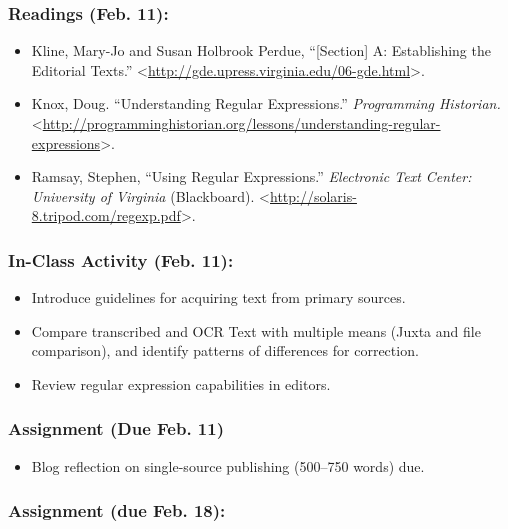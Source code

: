 \documentclass[]{article}
\begin{document}
\subsubsection{Readings (Feb. 11):}\label{readings-feb.-11}

\begin{itemize}
\itemsep1pt\parskip0pt
\item
  Kline, Mary-Jo and Susan Holbrook Perdue, ``{[}Section{]} A:
  Establishing the Editorial Texts.''
  \textless{}\url{http://gde.upress.virginia.edu/06-gde.html}\textgreater{}.
\item
  Knox, Doug. ``Understanding Regular Expressions.'' \emph{Programming
  Historian.}
  \textless{}\url{http://programminghistorian.org/lessons/understanding-regular-expressions}\textgreater{}.
\item
  Ramsay, Stephen, ``Using Regular Expressions.'' \emph{Electronic Text
  Center: University of Virginia} (Blackboard).
  \textless{}\url{http://solaris-8.tripod.com/regexp.pdf}\textgreater{}.
\end{itemize}

\subsubsection{In-Class Activity (Feb.
11):}\label{in-class-activity-feb.-11}

\begin{itemize}
\itemsep1pt\parskip0pt
\item
  Introduce guidelines for acquiring text from primary sources.
\item
  Compare transcribed and OCR Text with multiple means (Juxta and file
  comparison), and identify patterns of differences for correction.
\item
  Review regular expression capabilities in editors.
\end{itemize}

\subsubsection{Assignment (Due Feb. 11)}\label{assignment-due-feb.-11}

\begin{itemize}
\itemsep1pt\parskip0pt
\item
  Blog reflection on single-source publishing (500--750 words) due.
\end{itemize}

\subsubsection{Assignment (due Feb. 18):}\label{assignment-due-feb.-18}
\end{document}

